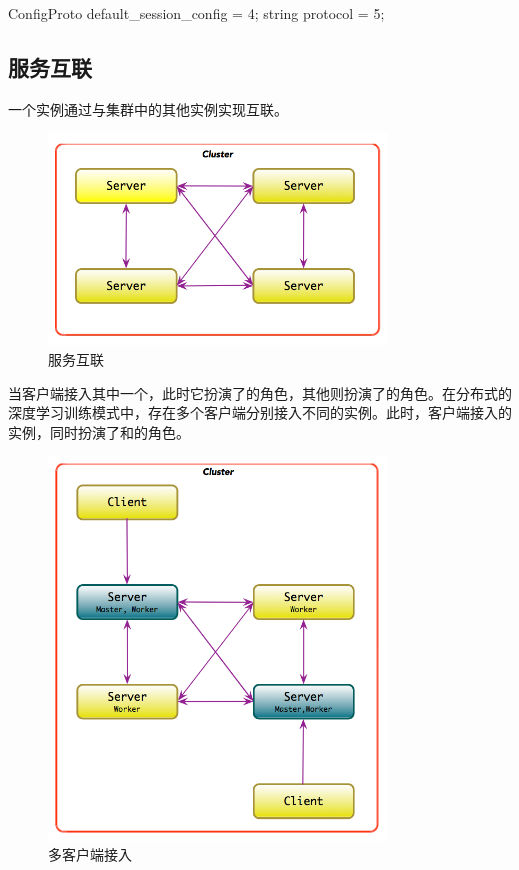 \begin{content}
\begin{leftbar}
\begin{python}
{  ConfigProto default_session_config = 4;
  string protocol = 5;
}
\end{python}
\end{leftbar}

\subsection{服务互联}

一个实例通过与集群中的其他实例实现互联。

\begin{figure}[!h]
\centering
\includegraphics[width=0.8\textwidth]{figures/cc-server-interact.png}
\caption{服务互联}
 \label{fig:cc-server-interact}
\end{figure}

当客户端接入其中一个，此时它扮演了的角色，其他则扮演了的角色。在分布式的深度学习训练模式中，存在多个客户端分别接入不同的实例。此时，客户端接入的实例，同时扮演了和的角色。

\begin{figure}[!h]
\centering
\includegraphics[width=0.8\textwidth]{figures/cc-server-interact-2.png}
\caption{多客户端接入}
 \label{fig:cc-server-interact-2}
\end{figure}


\end{content}
